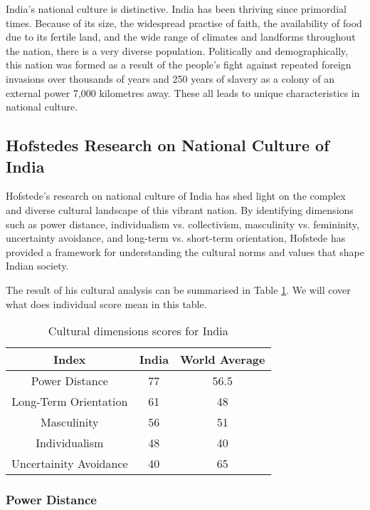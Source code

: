 \documentclass{article}
\begin{document}
India's national culture is distinctive. India has been thriving since primordial times. Because of its size, the widespread practise of faith, the availability of food due to its fertile land, and the wide range of climates and landforms throughout the nation, there is a very diverse population. Politically and demographically, this nation was formed as a result of the people's fight against repeated foreign invasions over thousands of years and 250 years of slavery as a colony of an external power 7,000 kilometres away. These all leads to unique characteristics in national culture.

\subsection{Hofstedes Research on National Culture of India}

Hofstede's research on national culture of India\cite{ref:Hofstede's research on national culture of India} has shed light on the complex and diverse cultural landscape of this vibrant nation. By identifying dimensions such as power distance, individualism vs. collectivism, masculinity vs. femininity, uncertainty avoidance, and long-term vs. short-term orientation, Hofstede has provided a framework for understanding the cultural norms and values that shape Indian society.

The result of his cultural analysis can be summarised in Table \ref{Table 1}. We will cover what does individual score mean in this table.

\begin{table}
    \begin{center}
    \begin{tabular}{|c|c|c|}
        \hline
        Index & India & World Average \\
        \hline
        Power Distance & 77 & 56.5 \\
        Long-Term Orientation & 61 & 48 \\
        Masculinity & 56 & 51 \\
        Individualism & 48 & 40 \\
        Uncertainity Avoidance & 40 & 65 \\
        \hline
    \end{tabular}
    \caption{Cultural dimensions scores for India}
    \label{Table 1}
    \end{center}
\end{table}

\subsubsection{Power Distance}
\end{document}
